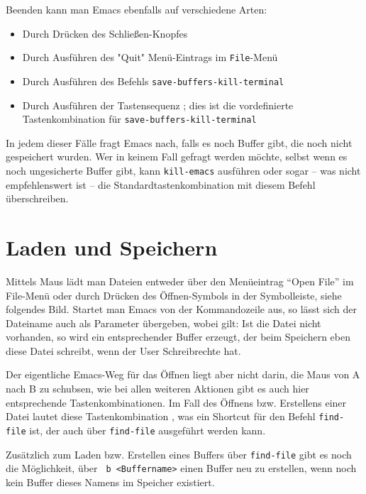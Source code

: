 \documentclass[12pt,ngerman]{scrbook}
\begin{document}
Beenden kann man Emacs ebenfalls auf verschiedene Arten:

\begin{itemize}
	\item Durch Drücken des Schließen-Knopfes 
	\item Durch Ausführen des "Quit" Menü-Eintrags im \texttt{File}-Menü
	\item Durch Ausführen des Befehls   \texttt{save-buffers-kill-terminal}
	\item Durch Ausführen der Tastensequenz  ; dies ist die vordefinierte Tastenkombination für  \texttt{save-buffers-kill-terminal}

\end{itemize}

In jedem dieser Fälle fragt Emacs nach, falls es noch Buffer gibt, die noch nicht gespeichert wurden. 
Wer in keinem Fall gefragt werden möchte, selbst wenn es noch ungesicherte Buffer gibt, kann  \texttt{kill-emacs} ausführen oder sogar -- was nicht empfehlenswert ist -- die Standardtastenkombination   mit diesem Befehl überschreiben.

\section{Laden und Speichern}

Mittels Maus lädt man Dateien entweder über den Menüeintrag \enquote{Open File} im File-Menü oder durch Drücken des Öffnen-Symbols in der Symbolleiste, siehe folgendes Bild. Startet man Emacs von der Kommandozeile aus, so lässt sich der Dateiname auch als Parameter übergeben, wobei gilt: Ist die Datei nicht vorhanden, so wird ein entsprechender Buffer erzeugt, der beim Speichern eben diese Datei schreibt, wenn der User Schreibrechte hat.

Der eigentliche Emacs-Weg für das Öffnen liegt aber nicht darin, die Maus von A nach B zu schubsen, wie bei allen weiteren Aktionen gibt es auch hier entsprechende Tastenkombinationen. Im Fall des Öffnens bzw. Erstellens einer Datei lautet diese Tastenkombination  , was ein Shortcut für den Befehl \texttt{find-file} ist, der auch über  \texttt{find-file} ausgeführt werden kann.

Zusätzlich zum Laden bzw. Erstellen eines Buffers über \texttt{find-file} gibt es noch die Möglichkeit, über  \texttt{~b <Buffername>} einen Buffer neu zu erstellen, wenn noch kein Buffer dieses Namens im Speicher existiert.
\end{document}
